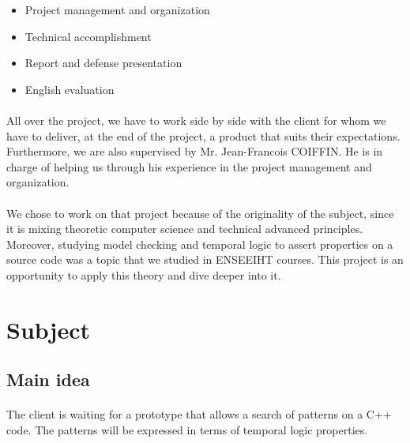 \documentclass{report}
\begin{document}
\vspace{3mm}
\begin{itemize}
\item Project management and organization\vspace{1mm}
\item Technical accomplishment\vspace{1mm}
\item Report and defense presentation\vspace{1mm}
\item English evaluation\vspace{1mm}
\end{itemize}

\paragraph{}
\hspace{4mm}\textnormal{All over the project, we have to work side by side with the client 
for whom we have to deliver, at the end of the project, a product
 that suits their expectations. Furthermore, we are also supervised 
by Mr. Jean-Francois COIFFIN. He is in charge of helping us 
through his experience in the project management and organization.}

\paragraph{}
\hspace{4mm}\textnormal{We chose to work on that project because of the originality of 
the subject, since it is mixing theoretic computer science and 
technical advanced principles. Moreover, studying model checking 
and temporal logic to assert properties on a source code was a topic that we studied in ENSEEIHT courses. This project is an opportunity to apply this theory and dive deeper into it.}

\section{Subject}

\subsection{Main idea}

\paragraph{}
\hspace{4mm}\textnormal{The client is waiting for a prototype that allows a search of patterns on a C++ code. The patterns will be expressed in terms of temporal logic properties.}
\end{document}
